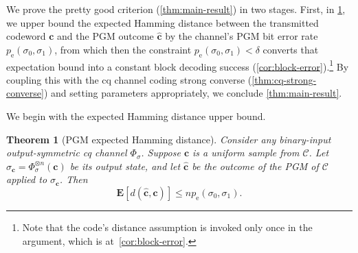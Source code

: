 \documentclass[11pt]{article}
\renewcommand{\leq}{\leqslant}
\newtheorem{theorem}{Theorem}
\theoremstyle{remark}
\newcommand{\cC}{\mathcal{C}}
\newcommand{\Eb}{\mathbf{E}}
\newcommand{\bchat}{\hat{\mathbf{c}}}
\newcommand{\bc}{\mathbf{c}}
\begin{document}
We prove the pretty good criterion (\cref{thm:main-result}) in two stages. First, in \cref{thm:expected-hamming}, we upper bound the expected Hamming distance between the transmitted codeword $\bc$ and the PGM outcome $\bchat$ by the channel's PGM bit error rate $p_{\mathrm{e}}(\sigma_0,\sigma_1)$, from which then the constraint $p_{\mathrm{e}}(\sigma_0,\sigma_1) < \delta$ converts that expectation bound into a constant block decoding success (\cref{cor:block-error}).\footnote{Note that the code's distance assumption is invoked only once in the argument, which is at~\cref{cor:block-error}.} By coupling this with the cq channel coding strong converse (\cref{thm:cq-strong-converse}) and setting parameters appropriately, we conclude \cref{thm:main-result}.

We begin with the expected Hamming distance upper bound.

\begin{theorem}[PGM expected Hamming distance]
\label{thm:expected-hamming}
Consider any binary-input output-symmetric cq channel $\Phi_\sigma$. Suppose $\bc$ is a uniform sample from $\cC$. Let $\sigma_{\bc} = \Phi_\sigma^{\otimes n}(\bc)$ be its output state, and let $\bchat$ be the outcome of the PGM of $\cC$ applied to $\sigma_{\bc}$. Then
\begin{equation*}
\Eb \left[d(\bchat,\bc)\right] \leq n p_{\mathrm{e}}(\sigma_0,\sigma_1).
\end{equation*}
\end{theorem}
\end{document}
